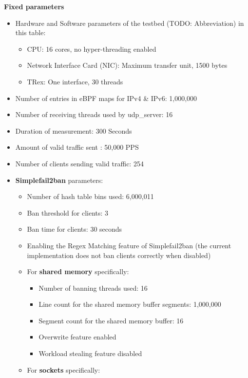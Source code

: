 \bigskip
\noindent
\textbf{Fixed parameters}
\begin{itemize}
    \item Hardware and Software parameters of the testbed (TODO: Abbreviation) in this table\@:
    \begin{itemize}
        \item CPU\@: 16 cores, no hyper-threading enabled
        \item Network Interface Card (NIC)\@: Maximum transfer unit, 1500 bytes
        \item TRex\@: One interface, 30 threads
    \end{itemize}
    \item Number of entries in eBPF maps for IPv4 \& IPv6\@: 1,000,000
    \item Number of receiving threads used by udp\_server\@: 16
    \item Duration of measurement\@: 300 Seconds
    \item Amount of valid traffic sent \@: 50,000 PPS
    \item Number of clients sending valid traffic\@: 254
    \item \textbf{Simplefail2ban} parameters\@:
    \begin{itemize}
        \item Number of hash table bins used\@: 6,000,011
        \item Ban threshold for clients\@: 3
        \item Ban time for clients\@: 30 seconds
        \item Enabling the Regex Matching feature of Simplefail2ban (the current implementation does not ban clients correctly when disabled)
        \item For \textbf{shared memory} specifically\@:
        \begin{itemize}
            \item Number of banning threads used\@: 16
            \item Line count for the shared memory buffer segments\@: 1,000,000
            \item Segment count for the shared memory buffer\@: 16
            \item Overwrite feature enabled
            \item Workload stealing feature disabled
        \end{itemize}
        \item For \textbf{sockets} specifically\@:
        \begin{itemize}

\end{itemize}
\end{itemize}
\end{itemize}
